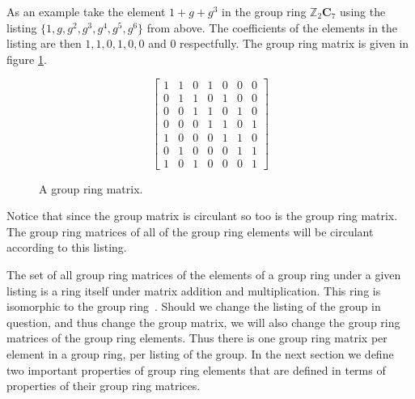 As an example take the element $1+g+g^3$ in the group ring $\mathbb{Z}_2 \mathbf{C}_7$ using the listing $\{ 1 , g , g^2 , g^3 , g^4 , g^5 , g^6 \}$ from above.
The coefficients of the elements in the listing are then $1,1,0,1,0,0$ and $0$ respectfully.
The group ring matrix is given in figure \ref{fig:circulantrgmat}.
\begin{figure}[htbp]
\begin{center}
\[
\left[
\begin{array}{ccccccc}
1 & 1 & 0 & 1 & 0 & 0 & 0 \\
0 & 1 & 1 & 0 & 1 & 0 & 0 \\
0 & 0 & 1 & 1 & 0 & 1 & 0 \\
0 & 0 & 0 & 1 & 1 & 0 & 1 \\
1 & 0 & 0 & 0 & 1 & 1 & 0 \\
0 & 1 & 0 & 0 & 0 & 1 & 1 \\
1 & 0 & 1 & 0 & 0 & 0 & 1 
\end{array}
\right]
\]
\caption{A group ring matrix.}
\label{fig:circulantrgmat}
\end{center}
\end{figure}
Notice that since the group matrix is circulant so too is the group ring matrix.
The group ring matrices of all of the group ring elements will be circulant according to this listing.

The set of all group ring matrices of the elements of a group ring under a given listing is a ring itself under matrix addition and multiplication.
This ring is isomorphic to the group ring~\cite{hur06}.
Should we change the listing of the group in question, and thus change the group matrix, we will also change the group ring matrices of the group ring elements.
Thus there is one group ring matrix per element in a group ring, per listing of the group.
In the next section we define two important properties of group ring elements that are defined in terms of properties of their group ring matrices.

